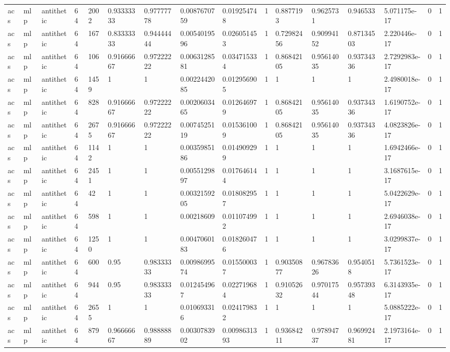 \begin{tabular}{llllllllllllllll}
acs & mlp & antithetic & 64 & 2002 & 0.93333333 & 0.97777778 & 0.0087670759 & 0.019254748 & 1 & 0.8877193 & 0.9625731 & 0.946533 & 5.071175e-17 & 0 & 1 \\
acs & mlp & antithetic & 64 & 167 & 0.83333333 & 0.94444444 & 0.0054019596 & 0.026051453 & 1 & 0.72982456 & 0.90994152 & 0.87134503 & 2.220446e-17 & 0 & 1 \\
acs & mlp & antithetic & 64 & 106 & 0.91666667 & 0.97222222 & 0.0063128581 & 0.034715334 & 1 & 0.86842105 & 0.95614035 & 0.93734336 & 2.7292983e-17 & 0 & 1 \\
acs & mlp & antithetic & 64 & 1459 & 1 & 1 & 0.0022442085 & 0.012956905 & 1 & 1 & 1 & 1 & 2.4980018e-17 & 0 & 1 \\
acs & mlp & antithetic & 64 & 828 & 0.91666667 & 0.97222222 & 0.0020603465 & 0.012646979 & 1 & 0.86842105 & 0.95614035 & 0.93734336 & 1.6190752e-17 & 0 & 1 \\
acs & mlp & antithetic & 64 & 2675 & 0.91666667 & 0.97222222 & 0.0074525119 & 0.015361009 & 1 & 0.86842105 & 0.95614035 & 0.93734336 & 4.0823826e-17 & 0 & 1 \\
acs & mlp & antithetic & 64 & 1142 & 1 & 1 & 0.0035985186 & 0.014909299 & 1 & 1 & 1 & 1 & 1.6942466e-17 & 0 & 1 \\
acs & mlp & antithetic & 64 & 2451 & 1 & 1 & 0.0055129897 & 0.017646144 & 1 & 1 & 1 & 1 & 3.1687615e-17 & 0 & 1 \\
acs & mlp & antithetic & 64 & 42 & 1 & 1 & 0.0032159205 & 0.018082957 & 1 & 1 & 1 & 1 & 5.0422629e-17 & 0 & 1 \\
acs & mlp & antithetic & 64 & 598 & 1 & 1 & 0.00218609 & 0.011074992 & 1 & 1 & 1 & 1 & 2.6946038e-17 & 0 & 1 \\
acs & mlp & antithetic & 64 & 1250 & 1 & 1 & 0.0047060183 & 0.018260476 & 1 & 1 & 1 & 1 & 3.0299837e-17 & 0 & 1 \\
acs & mlp & antithetic & 64 & 600 & 0.95 & 0.98333333 & 0.0098699574 & 0.015500037 & 1 & 0.90350877 & 0.96783626 & 0.9540518 & 5.7361523e-17 & 0 & 1 \\
acs & mlp & antithetic & 64 & 944 & 0.95 & 0.98333333 & 0.012454967 & 0.022719684 & 1 & 0.91052632 & 0.97017544 & 0.95739348 & 6.3143935e-17 & 0 & 1 \\
acs & mlp & antithetic & 64 & 2655 & 1 & 1 & 0.010693316 & 0.024179832 & 1 & 1 & 1 & 1 & 5.0885222e-17 & 0 & 1 \\
acs & mlp & antithetic & 64 & 879 & 0.96666667 & 0.98888889 & 0.0030783902 & 0.0098631393 & 1 & 0.93684211 & 0.97894737 & 0.96992481 & 2.1973164e-17 & 0 & 1 \\

\end{tabular}
